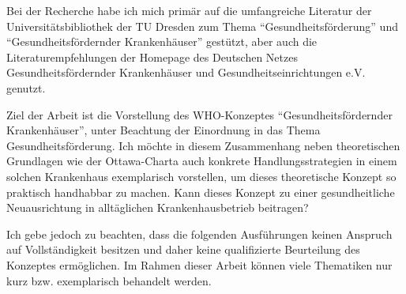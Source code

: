 Bei der Recherche habe ich mich primär auf die umfangreiche Literatur der Universitätsbibliothek der TU Dresden zum Thema "`Gesundheitsförderung"' und "`Gesundheitsfördernder Krankenhäuser"' gestützt, aber auch die Literaturempfehlungen der Homepage des Deutschen Netzes Gesundheitsfördernder Krankenhäuser und Gesundheitseinrichtungen e.V. genutzt.
 
Ziel der Arbeit ist die Vorstellung des WHO-Konzeptes "`Gesundheitsfördernder Krankenhäuser"', unter Beachtung der Einordnung in das Thema Gesundheitsförderung. Ich möchte in diesem Zusammenhang neben theoretischen Grundlagen wie der Ottawa-Charta auch konkrete Handlungsstrategien in einem solchen Krankenhaus exemplarisch vorstellen, um dieses theoretische Konzept so praktisch handhabbar zu machen. Kann dieses Konzept zu einer gesundheitliche Neuausrichtung in alltäglichen Krankenhausbetrieb beitragen?

Ich gebe jedoch zu beachten, dass die folgenden Ausführungen keinen Anspruch auf Vollständigkeit besitzen und daher keine qualifizierte Beurteilung des Konzeptes ermöglichen. Im Rahmen dieser Arbeit können viele Thematiken nur kurz bzw. exemplarisch behandelt werden. 

